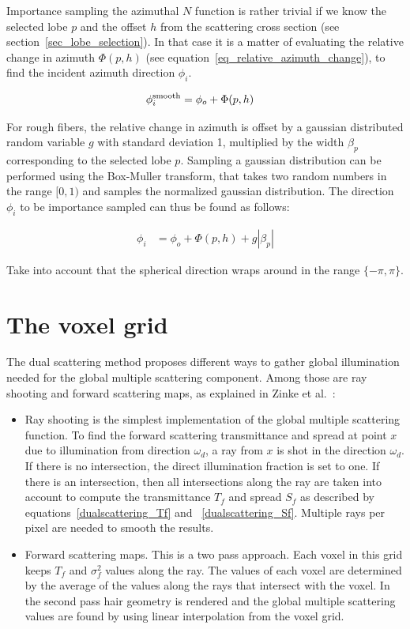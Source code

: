 \documentclass[11pt,a4paper]{report}
\begin{document}
Importance sampling the azimuthal $N$ function is rather trivial if we know the selected lobe $p$ and the offset $h$ from the scattering cross section (see section~\ref{sec_lobe_selection}). In that case it is a matter of evaluating the relative change in azimuth $\Phi(p, h)$ (see equation~\ref{eq_relative_azimuth_change}), to find the incident azimuth direction $\phi_i$.

\begin{align}
\label{phi_func}
\phi_i^{\textnormal{smooth}} &= \phi_o + \Phi(p, h)
\end{align}

For rough fibers, the relative change in azimuth is offset by a gaussian distributed random variable $g$ with standard deviation 1, multiplied by the width $\beta_p$ corresponding to the selected lobe $p$. Sampling a gaussian distribution can be performed using the Box-Muller transform, that takes two random numbers in the range $[0, 1)$ and samples the normalized gaussian distribution. The direction $\phi_i$ to be importance sampled can thus be found as follows:

\begin{align}
\phi_i &= \phi_o + \Phi(p, h) + g | \beta_p | 
\end{align}

Take into account that the spherical direction wraps around in the range $\{ -\pi, \pi \}$.

\section{The voxel grid}

The dual scattering method proposes different ways to gather global illumination needed for the global multiple scattering component. Among those are ray shooting and forward scattering maps, as explained in Zinke et al.~\cite{zinke}:

\begin{itemize}
\item Ray shooting is the simplest implementation of the global multiple scattering function. To find the forward scattering transmittance and spread at point $x$ due to illumination from direction $\omega_d$, a ray from $x$ is shot in the direction $\omega_d$. If there is no intersection, the direct illumination fraction is set to one. If there is an intersection, then all intersections along the ray are taken into account to compute the transmittance $T_f$ and spread $S_f$ as described by equations~\ref{dualscattering_Tf} and ~\ref{dualscattering_Sf}. Multiple rays per pixel are needed to smooth the results.

\item Forward scattering maps. This is a two pass approach. Each voxel in this grid keeps $T_f$ and $\sigma_f^2$ values along the ray. The values of each voxel are determined by the average of the values along the rays that intersect with the voxel. In the second pass hair geometry is rendered and the global multiple scattering values are found by using linear interpolation from the voxel grid.
\end{itemize}
\end{document}
